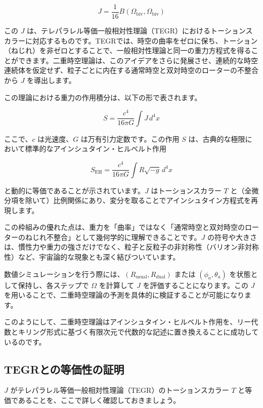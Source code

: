 \documentclass[a4paper,12pt,notitlepage]{jsreport}
\begin{document}
\begin{equation}
  J = \frac{1}{16} B(\Omega_{\text{biv}}, \Omega_{\text{biv}})
\end{equation}

この $J$ は、テレパラレル等価一般相対性理論（TEGR）におけるトーションスカラーに対応するものです。TEGRでは、時空の曲率をゼロに保ち、トーション（ねじれ）を非ゼロとすることで、一般相対性理論と同一の重力方程式を得ることができます。二重時空理論は、このアイデアをさらに発展させ、連続的な時空連続体を仮定せず、粒子ごとに内在する通常時空と双対時空のローターの不整合から $J$ を導出します。

この理論における重力の作用積分は、以下の形で表されます。

\begin{equation}
  S = \frac{c^4}{16 \pi G} \int J \, d^4 x
\end{equation}

ここで、$c$ は光速度、$G$ は万有引力定数です。この作用 $S$ は、古典的な極限において標準的なアインシュタイン・ヒルベルト作用

\[ S_{\text{EH}} = \frac{c^4}{16\pi G} \int R \sqrt{-g} \, d^4 x \]

と動的に等価であることが示されています。$J$ はトーションスカラー $T$ と（全微分項を除いて）比例関係にあり、変分を取ることでアインシュタイン方程式を再現します。

この枠組みの優れた点は、重力を「曲率」ではなく「通常時空と双対時空のローターのねじれ不整合」として幾何学的に理解できることです。$J$ の符号や大きさは、慣性力や重力の強さだけでなく、粒子と反粒子の非対称性（バリオン非対称性）など、宇宙論的な現象とも深く結びついています。

数値シミュレーションを行う際には、$(R_\text{usual}, R_\text{dual})$ または $(\phi_a, \theta_a)$ を状態として保持し、各ステップで $\Omega$ を計算して $J$ を評価することになります。この $J$ を用いることで、二重時空理論の予測を具体的に検証することが可能になります。

このようにして、二重時空理論はアインシュタイン・ヒルベルト作用を、リー代数とキリング形式に基づく有限次元で代数的な記述に置き換えることに成功しているのです。

\subsection{TEGRとの等価性の証明}

$J$ がテレパラレル等価一般相対性理論（TEGR）のトーションスカラー $T$ と等価であることを、ここで詳しく確認しておきましょう。
\end{document}

